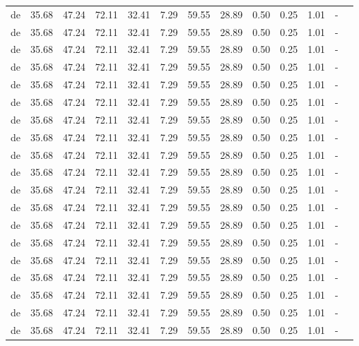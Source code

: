 \begin{table}[H]
\begin{tabularx}{\textwidth}{Xcccccccccccc}
            de & 35.68 & 47.24 & 72.11 & 32.41 & 7.29 & 59.55 & 28.89 & 0.50 & 0.25 & 1.01 & - \\
            de & 35.68 & 47.24 & 72.11 & 32.41 & 7.29 & 59.55 & 28.89 & 0.50 & 0.25 & 1.01 & - \\
            de & 35.68 & 47.24 & 72.11 & 32.41 & 7.29 & 59.55 & 28.89 & 0.50 & 0.25 & 1.01 & - \\
            de & 35.68 & 47.24 & 72.11 & 32.41 & 7.29 & 59.55 & 28.89 & 0.50 & 0.25 & 1.01 & - \\
            de & 35.68 & 47.24 & 72.11 & 32.41 & 7.29 & 59.55 & 28.89 & 0.50 & 0.25 & 1.01 & - \\
            de & 35.68 & 47.24 & 72.11 & 32.41 & 7.29 & 59.55 & 28.89 & 0.50 & 0.25 & 1.01 & - \\
            de & 35.68 & 47.24 & 72.11 & 32.41 & 7.29 & 59.55 & 28.89 & 0.50 & 0.25 & 1.01 & - \\
            de & 35.68 & 47.24 & 72.11 & 32.41 & 7.29 & 59.55 & 28.89 & 0.50 & 0.25 & 1.01 & - \\
            de & 35.68 & 47.24 & 72.11 & 32.41 & 7.29 & 59.55 & 28.89 & 0.50 & 0.25 & 1.01 & - \\
            de & 35.68 & 47.24 & 72.11 & 32.41 & 7.29 & 59.55 & 28.89 & 0.50 & 0.25 & 1.01 & - \\
            de & 35.68 & 47.24 & 72.11 & 32.41 & 7.29 & 59.55 & 28.89 & 0.50 & 0.25 & 1.01 & - \\
            de & 35.68 & 47.24 & 72.11 & 32.41 & 7.29 & 59.55 & 28.89 & 0.50 & 0.25 & 1.01 & - \\
            de & 35.68 & 47.24 & 72.11 & 32.41 & 7.29 & 59.55 & 28.89 & 0.50 & 0.25 & 1.01 & - \\
            de & 35.68 & 47.24 & 72.11 & 32.41 & 7.29 & 59.55 & 28.89 & 0.50 & 0.25 & 1.01 & - \\
            de & 35.68 & 47.24 & 72.11 & 32.41 & 7.29 & 59.55 & 28.89 & 0.50 & 0.25 & 1.01 & - \\
            de & 35.68 & 47.24 & 72.11 & 32.41 & 7.29 & 59.55 & 28.89 & 0.50 & 0.25 & 1.01 & - \\
            de & 35.68 & 47.24 & 72.11 & 32.41 & 7.29 & 59.55 & 28.89 & 0.50 & 0.25 & 1.01 & - \\
            de & 35.68 & 47.24 & 72.11 & 32.41 & 7.29 & 59.55 & 28.89 & 0.50 & 0.25 & 1.01 & - \\
            de & 35.68 & 47.24 & 72.11 & 32.41 & 7.29 & 59.55 & 28.89 & 0.50 & 0.25 & 1.01 & - \\

\end{tabularx}
\end{table}
